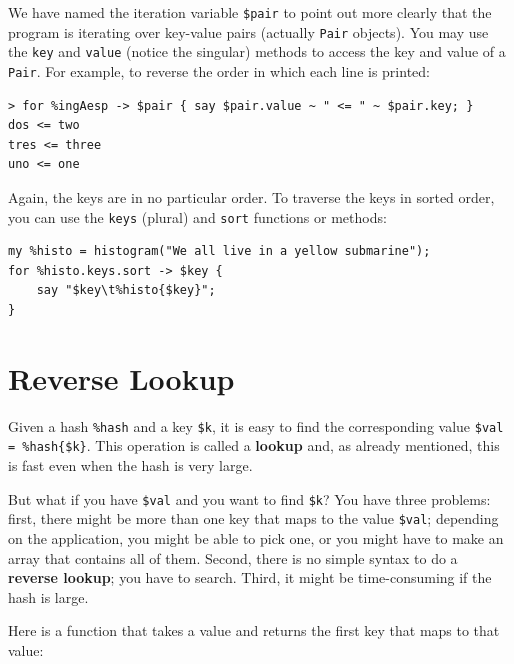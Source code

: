 We have named the iteration variable \verb'$pair' to point 
out more clearly that the program is iterating over key-value 
pairs (actually \verb'Pair' objects). You may use the 
{\tt key} and {\tt value} (notice the singular) methods to 
access the key and value of a \verb'Pair'. For example, to 
reverse the order in which each line is printed:

\begin{verbatim}
> for %ingAesp -> $pair { say $pair.value ~ " <= " ~ $pair.key; }
dos <= two
tres <= three
uno <= one
\end{verbatim}

Again, the keys are in no particular order.  To traverse 
the keys in sorted order, you can use the {\tt keys} 
(plural) and {\tt sort} functions or methods:

\begin{verbatim}
my %histo = histogram("We all live in a yellow submarine");
for %histo.keys.sort -> $key {
    say "$key\t%histo{$key}";
}
\end{verbatim}



\section{Reverse Lookup}
\label{raise}

Given a hash \verb'%hash' and a key \verb'$k', it is easy to
find the corresponding value \verb'$val = %hash{$k}'.  
This operation is called a {\bf lookup} and, as already 
mentioned, this is fast even when the hash is very large.

But what if you have \verb'$val' and you want to find 
\verb'$k'? You have three problems: first, there might be 
more than one key that maps to the value \verb'$val'; depending 
on the application, you might be able to pick one, or you 
might have to make an array that contains all of them.  
Second, there is no simple syntax to do a {\bf reverse lookup}; 
you have to search. Third, it might be time-consuming if 
the hash is large.

Here is a function that takes a value and returns the first
key that maps to that value:	

